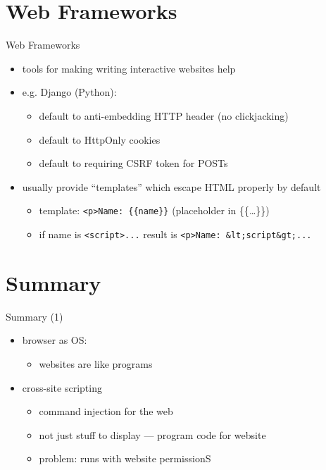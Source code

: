 \section{Web Frameworks}

\begin{frame}[fragile,label=webFramework]{Web Frameworks}
    \begin{itemize}
    \item tools for making writing interactive websites help
    \item e.g. Django (Python): 
        \begin{itemize}
            \item default to anti-embedding HTTP header (no clickjacking)
        \item default to HttpOnly cookies
        \item default to requiring CSRF token for POSTs
        \end{itemize}
    \item usually provide ``templates'' which escape HTML properly by default
        \begin{itemize}
            \item template: \verb|<p>Name: {{name}}| (placeholder in \{\{\ldots\}\})
            \item if name is \verb|<script>...| result is \verb|<p>Name: &lt;script&gt;...|
        \end{itemize}
    \end{itemize}
\end{frame}

\section{Summary}

\begin{frame}{Summary (1)}
    \begin{itemize}
    \item browser as OS:
        \begin{itemize}
        \item websites are like programs
        \end{itemize}
    \item cross-site scripting
        \begin{itemize}
        \item command injection for the web
        \item not just stuff to display --- program code for website
        \item problem: runs with website permissionS
        \end{itemize}
    \end{itemize}
\end{frame}

